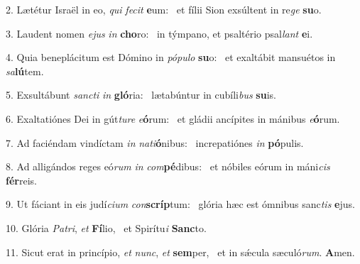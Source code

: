 2. Lætétur Israël in eo, \textit{qui} \textit{fe}\textit{cit} \textbf{e}um: \ast\  et fílii Sion exsúltent in re\textit{ge} \textbf{su}o.\

3. Laudent nomen \textit{e}\textit{jus} \textit{in} \textbf{cho}ro: \ast\  in týmpano, et psaltério psal\textit{lant} \textbf{e}i.\

4. Quia beneplácitum est Dómino in \textit{pó}\textit{pu}\textit{lo} \textbf{su}o: \ast\  et exaltábit mansuétos in \textit{sa}\textbf{lú}tem.\

5. Exsultábunt \textit{sanc}\textit{ti} \textit{in} \textbf{gló}ria: \ast\  lætabúntur in cubíli\textit{bus} \textbf{su}is.\

6. Exaltatiónes Dei in gút\textit{tu}\textit{re} \textit{e}\textbf{ó}rum: \ast\  et gládii ancípites in mánibus \textit{e}\textbf{ó}rum.\

7. Ad faciéndam vindíctam \textit{in} \textit{na}\textit{ti}\textbf{ó}nibus: \ast\  increpatiónes \textit{in} \textbf{pó}pulis.\

8. Ad alligándos reges eó\textit{rum} \textit{in} \textit{com}\textbf{pé}dibus: \ast\  et nóbiles eórum in máni\textit{cis} \textbf{fér}reis.\

9. Ut fáciant in eis judí\textit{ci}\textit{um} \textit{con}\textbf{scríp}tum: \ast\  glória hæc est ómnibus sanc\textit{tis} \textbf{e}jus.\

10. Glória \textit{Pa}\textit{tri}, \textit{et} \textbf{Fí}lio, \ast\  et Spirítu\textit{i} \textbf{Sanc}to.\

11. Sicut erat in princípio, \textit{et} \textit{nunc}, \textit{et} \textbf{sem}per, \ast\  et in sǽcula sæculó\textit{rum}. \textbf{A}men.\

